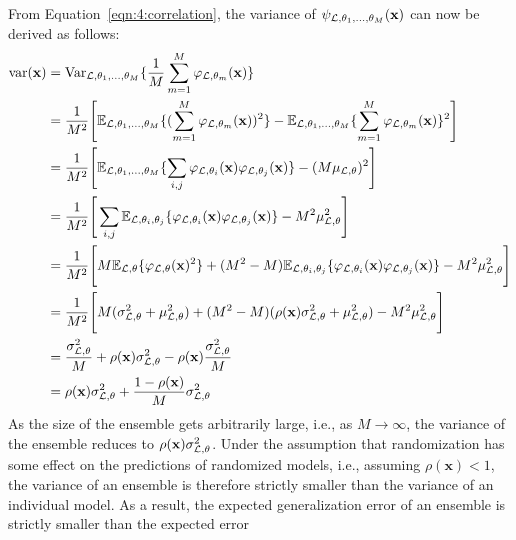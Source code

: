 From Equation~\ref{eqn:4:correlation}, the variance of $\psi_{{\cal
L},\theta_1,\dots,\theta_M}(\mathbf{x})$ can now be derived as follows:
\begin{align}
\text{var}(\mathbf{x}) &= \text{Var}_{{\cal L},\theta_1,\dots,\theta_M} \{ \frac{1}{M} \sum_{m=1}^M \varphi_{{\cal L},\theta_m}(\mathbf{x})  \} \nonumber \\
&= \frac{1}{M^2} \Bigg[ \mathbb{E}_{{\cal L},\theta_1,\dots,\theta_M} \{ (\sum_{m=1}^M \varphi_{{\cal L},\theta_m}(\mathbf{x}))^2 \} - \mathbb{E}_{{\cal L},\theta_1,\dots,\theta_M} \{ \sum_{m=1}^M \varphi_{{\cal L},\theta_m}(\mathbf{x}) \}^2 \Bigg] \nonumber \\
&= \frac{1}{M^2} \Bigg[ \mathbb{E}_{{\cal L},\theta_1,\dots,\theta_M} \{ \sum_{i,j} \varphi_{{\cal L},\theta_i}(\mathbf{x}) \varphi_{{\cal L},\theta_j}(\mathbf{x}) \} - (M \mu_{{\cal L},\theta})^2 \Bigg] \nonumber \\
&= \frac{1}{M^2} \Bigg[ \sum_{i,j} \mathbb{E}_{{\cal L},\theta_i,\theta_j} \{  \varphi_{{\cal L},\theta_i}(\mathbf{x}) \varphi_{{\cal L},\theta_j}(\mathbf{x}) \} - M^2 \mu^2_{{\cal L},\theta} \Bigg] \nonumber \\
&= \frac{1}{M^2} \Bigg[ M \mathbb{E}_{{\cal L},\theta} \{ \varphi_{{\cal L},\theta}(\mathbf{x})^2 \} + (M^2-M) \mathbb{E}_{{\cal L},\theta_i,\theta_j} \{  \varphi_{{\cal L},\theta_i}(\mathbf{x}) \varphi_{{\cal L},\theta_j}(\mathbf{x}) \}  - M^2 \mu^2_{{\cal L},\theta} \Bigg] \nonumber \\
&= \frac{1}{M^2} \Bigg[ M (\sigma^2_{{\cal L},\theta} + \mu^2_{{\cal L},\theta}) + (M^2-M)(\rho(\mathbf{x}) \sigma^2_{{\cal L},\theta} + \mu^2_{{\cal L},\theta}) - M^2 \mu^2_{{\cal L},\theta} \Bigg] \nonumber \\
&= \frac{\sigma^2_{{\cal L},\theta}}{M} + \rho(\mathbf{x})\sigma^2_{{\cal L},\theta} - \rho(\mathbf{x}) \frac{\sigma^2_{{\cal L},\theta}}{M} \nonumber \\
&= \rho(\mathbf{x}) \sigma^2_{{\cal L},\theta} + \frac{1 - \rho(\mathbf{x})}{M} \sigma^2_{{\cal L},\theta} \label{eqn:4:variance-hastie}
\end{align}
As the size of the ensemble gets arbitrarily large, i.e., as $M \to \infty$,
the variance of the ensemble reduces to $\rho(\mathbf{x})
\sigma^2_{{\cal L},\theta}$. Under the assumption that randomization has some
effect on the predictions of randomized models, i.e., assuming
$\rho(\mathbf{x}) < 1$, the variance of an ensemble is therefore strictly
smaller than the variance of an individual model. As a result, the expected
generalization error of an ensemble is strictly smaller than the expected error
